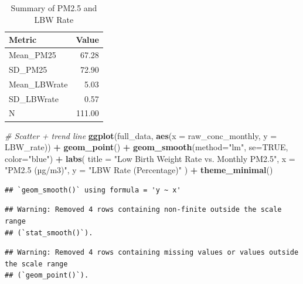 \documentclass[
]{article}
\newenvironment{Shaded}{\begin{snugshade}}{\end{snugshade}}
\newcommand{\AttributeTok}[1]{\textcolor[rgb]{0.13,0.29,0.53}{#1}}
\newcommand{\CommentTok}[1]{\textcolor[rgb]{0.56,0.35,0.01}{\textit{#1}}}
\newcommand{\ConstantTok}[1]{\textcolor[rgb]{0.56,0.35,0.01}{#1}}
\newcommand{\FunctionTok}[1]{\textcolor[rgb]{0.13,0.29,0.53}{\textbf{#1}}}
\newcommand{\NormalTok}[1]{#1}
\newcommand{\SpecialCharTok}[1]{\textcolor[rgb]{0.81,0.36,0.00}{\textbf{#1}}}
\newcommand{\StringTok}[1]{\textcolor[rgb]{0.31,0.60,0.02}{#1}}
\begin{document}
\begin{longtable}[t]{lr}
\caption{\label{tab:unnamed-chunk-2}Summary of PM2.5 and LBW Rate}\\
\toprule
Metric & Value\\
\midrule
Mean\_PM25 & 67.28\\
SD\_PM25 & 72.90\\
Mean\_LBWrate & 5.03\\
SD\_LBWrate & 0.57\\
N & 111.00\\
\bottomrule
\end{longtable}

\begin{Shaded}
\begin{Highlighting}[]
\CommentTok{\# Scatter + trend line}
\FunctionTok{ggplot}\NormalTok{(full\_data, }\FunctionTok{aes}\NormalTok{(}\AttributeTok{x =}\NormalTok{ raw\_conc\_monthly, }\AttributeTok{y =}\NormalTok{ LBW\_rate)) }\SpecialCharTok{+}
  \FunctionTok{geom\_point}\NormalTok{() }\SpecialCharTok{+}
  \FunctionTok{geom\_smooth}\NormalTok{(}\AttributeTok{method=}\StringTok{"lm"}\NormalTok{, }\AttributeTok{se=}\ConstantTok{TRUE}\NormalTok{, }\AttributeTok{color=}\StringTok{"blue"}\NormalTok{) }\SpecialCharTok{+}
  \FunctionTok{labs}\NormalTok{(}
    \AttributeTok{title =} \StringTok{"Low Birth Weight Rate vs. Monthly PM2.5"}\NormalTok{,}
    \AttributeTok{x     =} \StringTok{"PM2.5 (µg/m3)"}\NormalTok{,}
    \AttributeTok{y     =} \StringTok{"LBW Rate (Percentage)"}
\NormalTok{  ) }\SpecialCharTok{+}
  \FunctionTok{theme\_minimal}\NormalTok{()}
\end{Highlighting}
\end{Shaded}

\begin{verbatim}
## `geom_smooth()` using formula = 'y ~ x'
\end{verbatim}

\begin{verbatim}
## Warning: Removed 4 rows containing non-finite outside the scale range
## (`stat_smooth()`).
\end{verbatim}

\begin{verbatim}
## Warning: Removed 4 rows containing missing values or values outside the scale range
## (`geom_point()`).
\end{verbatim}
\end{document}
